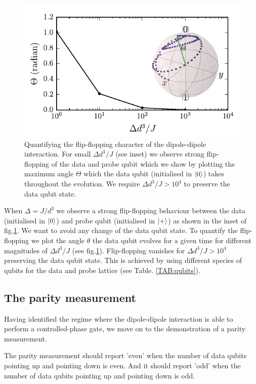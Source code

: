 \begin{figure}[H]
	\includegraphics[width=\linewidth]{../Figures/flip-flop}
	\caption{Quantifying the flip-flopping character of the dipole-dipole interaction. For small $\Delta d^3/ J$ (see inset) we observe strong flip-flopping of the data and probe qubit which we show by plotting the maximum angle $\Theta$ which the data qubit (initialised in $\ket{0}$) takes throughout the evolution. We require $\Delta d^3/ J > 10^4$ to preserve the data qubit state.}
	\label{FIG:flip-flop}
\end{figure}

When $\Delta = J/d^3$ we observe a strong flip-flopping behaviour between the data (initialised in $\ket{0}$) and probe qubit (initialised in $\ket{+}$) as shown in the inset of fig.\@ \ref{FIG:flip-flop}. We want to avoid any change of the data qubit state. To quantify the flip-flopping we plot the angle $\theta$ the data qubit evolves for a given time for different magnitudes of $\Delta d^3/ J$ (see fig.\@ \ref{FIG:flip-flop}). Flip-flopping vanishes for $\Delta d^3/ J > 10^4$ preserving the data qubit state. This is achieved by using different species of qubits for the data and probe lattice (see Table. \ref{TAB:qubits}).

\subsection{The parity measurement}
Having identified the regime where the dipole-dipole interaction is able to perform a controlled-phase gate, we move on to the demonstration of a parity measurement.

The parity measurement should report 'even' when the number of data qubits pointing up and pointing down is even. And it should report 'odd' when the number of data qubits pointing up and pointing down is odd.

